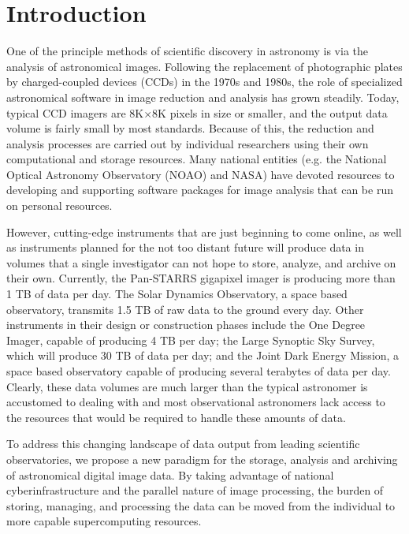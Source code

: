 \documentclass[10pt,conference]{IEEEtran}
\begin{document}
%
\IEEEpeerreviewmaketitle

\section{Introduction}\label{sec:intro}

One of the principle methods of scientific discovery in astronomy is via the analysis of astronomical images. Following the replacement of photographic plates by charged-coupled devices (CCDs) in the 1970s and 1980s, the role of specialized astronomical software in image reduction and analysis has grown steadily. Today, typical CCD imagers are 8K$\times$8K pixels in size or smaller, and the output data volume is fairly small by most standards. Because of this, the reduction and analysis processes are carried out by individual researchers using their own computational and storage resources. Many national entities (e.g. the National Optical Astronomy Observatory (NOAO) and NASA) have devoted resources to developing and supporting software packages for image analysis that can be run on personal resources.  

However, cutting-edge instruments that are just beginning to come online, as well as instruments planned for the not too distant future will produce data in volumes that a single investigator can not hope to store, analyze, and archive on their own. Currently, the Pan-STARRS gigapixel imager is producing more than 1 TB of data per day. The Solar Dynamics Observatory, a space based observatory, transmits 1.5 TB of raw data to the ground every day. Other instruments in their design or construction phases include the One Degree Imager, capable of producing 4 TB per day; the Large Synoptic Sky Survey, which will produce 30 TB of data per day; and the Joint Dark Energy Mission, a space based observatory capable of producing several terabytes of data per day. Clearly, these data volumes are much larger than the typical astronomer is accustomed to dealing with and most observational astronomers lack access to the resources that would be required to handle these amounts of data.

To address this changing landscape of data output from leading scientific observatories, we propose a new paradigm for the storage, analysis and archiving of astronomical digital image data. By taking advantage of national cyberinfrastructure and the parallel nature of image processing, the burden of storing, managing, and processing the data can be moved from the individual to more capable supercomputing resources.  
\end{document}
